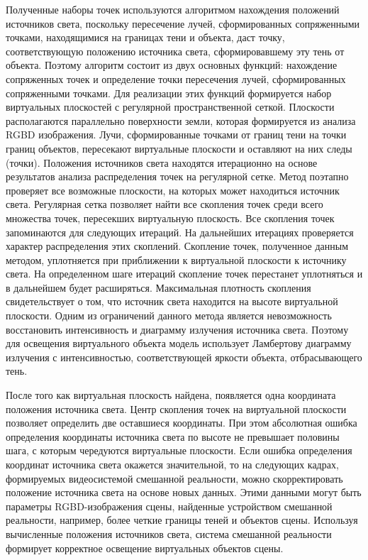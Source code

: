 Полученные наборы точек используются алгоритмом нахождения положений источников света, поскольку пересечение лучей, сформированных сопряженными точками, находящимися на границах тени и объекта, даст точку, соответствующую положению источника света, сформировавшему эту тень от объекта. Поэтому алгоритм состоит из двух основных функций: нахождение сопряженных точек и определение точки пересечения лучей, сформированных сопряженными точками. Для реализации этих функций формируется набор виртуальных плоскостей с регулярной пространственной сеткой. Плоскости располагаются параллельно поверхности земли, которая формируется из анализа RGBD изображения. Лучи, сформированные точками от границ тени на точки границ объектов, пересекают виртуальные плоскости и оставляют на них следы (точки). Положения источников света находятся итерационно на основе результатов анализа распределения точек на регулярной сетке. Метод поэтапно проверяет все возможные плоскости, на которых может находиться источник света. Регулярная сетка позволяет найти все скопления точек среди всего множества точек, пересекших виртуальную плоскость. Все скопления точек запоминаются для следующих итераций. На дальнейших итерациях проверяется характер распределения этих скоплений. Скопление точек, полученное данным методом, уплотняется при приближении к виртуальной плоскости к источнику света. На определенном шаге итераций скопление точек перестанет уплотняться и в дальнейшем будет расширяться. Максимальная плотность скопления свидетельствует о том, что источник света находится на высоте виртуальной плоскости. Одним из ограничений данного метода является невозможность восстановить интенсивность и диаграмму излучения источника света. Поэтому для освещения виртуального объекта модель использует Ламбертову диаграмму излучения с интенсивностью, соответствующей яркости объекта, отбрасывающего тень.

После того как виртуальная плоскость найдена, появляется одна координата положения источника света. Центр скопления точек на виртуальной плоскости позволяет определить две оставшиеся координаты. При этом абсолютная ошибка определения координаты источника света по высоте не превышает половины шага, с которым чередуются виртуальные плоскости. Если ошибка определения координат источника света окажется значительной, то на следующих кадрах, формируемых видеосистемой смешанной реальности, можно скорректировать положение источника света на основе новых данных. Этими данными могут быть параметры RGBD-изображения сцены, найденные устройством смешанной реальности, например, более четкие границы теней и объектов сцены. Используя вычисленные положения источников света, система смешанной реальности формирует корректное освещение виртуальных объектов сцены.

